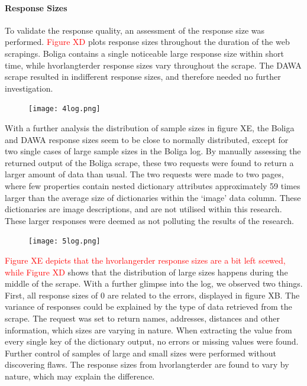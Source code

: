 \documentclass[12pt,a4paper]{article}
\begin{document}
\paragraph{Response Sizes\newline}
To validate the response quality, an assessment of the response size was performed. \textcolor{red}{Figure XD} plots response sizes throughout the duration of the web scrapings. Boliga contains a single noticeable large response size within short time, while hvorlangterder response sizes vary throughout the scrape. The DAWA scrape resulted in indifferent response sizes, and therefore needed no further investigation. 
\begin{figure}[H]
  \centering
   \caption{}
   \texttt{[image: 4log.png]} 
  \label{fig:}
\end{figure}
With a further analysis the distribution of sample sizes in figure XE, the Boliga and DAWA response sizes seem to be close to normally distributed, except for two single cases of large sample sizes in the Boliga log. By manually assessing the returned output of the Boliga scrape, these two requests were found to return a larger amount of data than usual. The two requests were made to two pages, where few properties contain nested dictionary attributes approximately 59 times larger than the average size of dictionaries within the ‘image’ data column. These dictionaries are image descriptions, and are not utilised within this research. These larger responses were deemed as not polluting the results of the research.
\begin{figure}[H]
  \centering
   \caption{}
   \texttt{[image: 5log.png]} 
  \label{fig:}
\end{figure}
\textcolor{red}{Figure XE depicts that the hvorlangerder response sizes are a bit left scewed, while Figure XD} shows that the distribution of large sizes happens during the middle of the scrape. With a further glimpse into the log, we observed two things. First, all response sizes of 0 are related to the errors, displayed in figure XB. The variance of responses could be explained by the type of data retrieved from the scrape. The request was set to return names, addresses, distances and other information, which sizes are varying in nature. When extracting the value from every single key of the dictionary output, no errors or missing values were found. Further control of samples of large and small sizes were performed without discovering flaws. The response sizes from hvorlangterder are found to vary by nature, which may explain the difference.  
\end{document}
